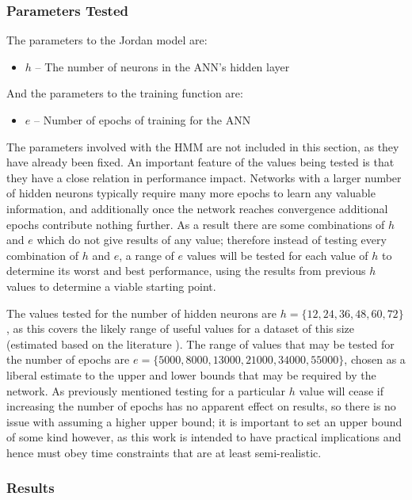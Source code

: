 \documentclass[ author={Stephen Livermore-Tozer},
				supervisor={Dr. Peter Flach},
				degree={MEng},
				title={Algorithmic Co-composition Using Machine Learning},
				subtitle={},
				type={research},
				year={2016} ]{dissertation}
\begin{document}
	\subsubsection{Parameters Tested}
	
	The parameters to the Jordan model are:
	\begin{itemize}
		\item $h$ -- The number of neurons in the ANN's hidden layer
	\end{itemize}
	And the parameters to the training function are:
	\begin{itemize}
		\item $e$ -- Number of epochs of training for the ANN
	\end{itemize}
	
	The parameters involved with the HMM are not included in this section, as they have already been fixed. An important feature of the values being tested is that they have a close relation in performance impact. Networks with a larger number of hidden neurons typically require many more epochs to learn any valuable information, and additionally once the network reaches convergence additional epochs contribute nothing further. As a result there are some combinations of $h$ and $e$ which do not give results of any value; therefore instead of testing every combination of $h$ and $e$, a range of $e$ values will be tested for each value of $h$ to determine its worst and best performance, using the results from previous $h$ values to determine a viable starting point. 
	
	The values tested for the number of hidden neurons are $h = \{12, 24, 36, 48, 60, 72\}$, as this covers the likely range of useful values for a dataset of this size (estimated based on the literature \cite{todd1989connectionist}). The range of values that may be tested for the number of epochs are $e = \{5000, 8000, 13000, 21000, 34000, 55000\}$, chosen as a liberal estimate to the upper and lower bounds that may be required by the network. As previously mentioned testing for a particular $h$ value will cease if increasing the number of epochs has no apparent effect on results, so there is no issue with assuming a higher upper bound; it is important to set an upper bound of some kind however, as this work is intended to have practical implications and hence must obey time constraints that are at least semi-realistic.
	
	\subsubsection{Results}
	
\end{document}
